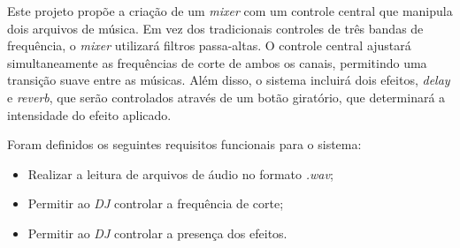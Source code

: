 Este projeto propõe a criação de um \textit{mixer} com um controle central que manipula dois arquivos de música. Em vez dos tradicionais controles de três bandas de frequência, o \textit{mixer} utilizará filtros passa-altas. O controle central ajustará simultaneamente as frequências de corte de ambos os canais, permitindo uma transição suave entre as músicas. Além disso, o sistema incluirá dois efeitos, \textit{delay} e \textit{reverb}, que serão controlados através de um botão giratório, que determinará a intensidade do efeito aplicado.





Foram definidos os seguintes requisitos funcionais para o sistema:

\begin{itemize}
    \item %
    Realizar a leitura de arquivos de áudio no formato \textit{.wav};
    \item %
    Permitir ao \textit{DJ} controlar a frequência de corte;
    \item %
    Permitir ao \textit{DJ} controlar a presença dos efeitos.
\end{itemize}

